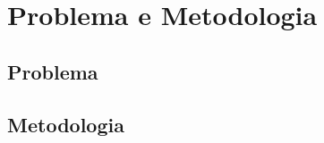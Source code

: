 \chapter{Problema e Metodologia}\label{chap:chap3}

\section*{}


\section{Problema}


\section{Metodologia}
